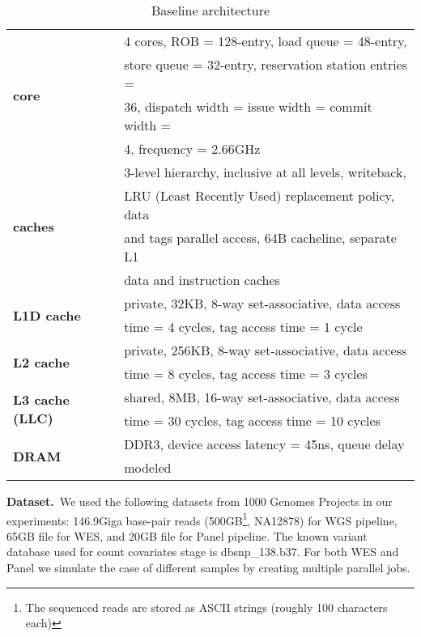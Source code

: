 \begin{table}[!htbp]
    \caption{Baseline architecture}
    \label{tab:1}
    \vspace{-12pt}
\renewcommand{\arraystretch}{1}
 \setlength{\tabcolsep}{2.5pt}
    \begin{center}
        \begin{tabular}{ | l | l | }
            \hline
            \multirow{4}{*}{\textbf{core}} & 4 cores, ROB = 128-entry, load queue = 48-entry, \\
           & store queue = 32-entry, reservation station entries = \\
           & 36, dispatch width = issue width = commit width = \\
           & 4, frequency = 2.66GHz\\
            \hline
            \multirow{4}{*}{\textbf{caches}} & 3-level hierarchy, inclusive at all levels, writeback, \\
           & LRU (Least Recently Used) replacement policy, data \\
           & and tags parallel access, 64B cacheline, separate L1 \\
           &  data and instruction caches\\
            \hline
            \multirow{2}{*}{\textbf{L1D cache}} & private, 32KB, 8-way set-associative, data access \\
           & time = 4 cycles, tag access time = 1 cycle \\
            \hline
            \multirow{2}{*}{\textbf{L2 cache}} & private, 256KB, 8-way set-associative, data access  \\
           & time = 8 cycles, tag access time = 3 cycles \\
            \hline
            \multirow{2}{*}{\textbf{L3 cache (LLC)}} & shared, 8MB, 16-way set-associative, data access \\
           & time = 30 cycles, tag access time = 10 cycles \\
            \hline
            \multirow{2}{*}{\textbf{DRAM}} & DDR3, device access latency = 45ns, queue delay \\
           & modeled\\
            \hline
        \end{tabular}        
    \end{center}
\end{table}

\textbf{Dataset.}~We used the following datasets from 1000 Genomes Projects in our experiments: 146.9Giga base-pair reads (500GB\footnote{The sequenced reads are stored as ASCII strings (roughly 100 characters each)}, NA12878) for WGS pipeline, 65GB file for WES, and 20GB file for Panel pipeline. The known variant database used for count covariates stage is dbsnp\_138.b37. For both WES and Panel we simulate the case of different samples by creating multiple parallel jobs.


